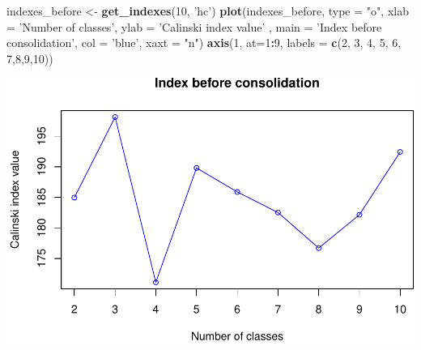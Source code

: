 \documentclass[]{article}
\newenvironment{Shaded}{\begin{snugshade}}{\end{snugshade}}
\newcommand{\KeywordTok}[1]{\textcolor[rgb]{0.13,0.29,0.53}{\textbf{#1}}}
\newcommand{\DataTypeTok}[1]{\textcolor[rgb]{0.13,0.29,0.53}{#1}}
\newcommand{\DecValTok}[1]{\textcolor[rgb]{0.00,0.00,0.81}{#1}}
\newcommand{\StringTok}[1]{\textcolor[rgb]{0.31,0.60,0.02}{#1}}
\newcommand{\OperatorTok}[1]{\textcolor[rgb]{0.81,0.36,0.00}{\textbf{#1}}}
\newcommand{\NormalTok}[1]{#1}
\begin{document}
\begin{Shaded}
\begin{Highlighting}[]
\NormalTok{indexes_before <-}\StringTok{ }\KeywordTok{get_indexes}\NormalTok{(}\DecValTok{10}\NormalTok{, }\StringTok{'hc'}\NormalTok{)}
\KeywordTok{plot}\NormalTok{(indexes_before, }\DataTypeTok{type =} \StringTok{"o"}\NormalTok{, }\DataTypeTok{xlab =} \StringTok{'Number of classes'}\NormalTok{, }\DataTypeTok{ylab =} \StringTok{'Calinski index value'}
\NormalTok{, }\DataTypeTok{main =} \StringTok{'Index before consolidation'}\NormalTok{, }\DataTypeTok{col =} \StringTok{'blue'}\NormalTok{, xaxt}
\NormalTok{=}\StringTok{ "n"}\NormalTok{)}
\KeywordTok{axis}\NormalTok{(}\DecValTok{1}\NormalTok{, }\DataTypeTok{at=}\DecValTok{1}\OperatorTok{:}\DecValTok{9}\NormalTok{, }\DataTypeTok{labels =} \KeywordTok{c}\NormalTok{(}\DecValTok{2}\NormalTok{, }\DecValTok{3}\NormalTok{, }\DecValTok{4}\NormalTok{, }\DecValTok{5}\NormalTok{, }\DecValTok{6}\NormalTok{, }\DecValTok{7}\NormalTok{,}\DecValTok{8}\NormalTok{,}\DecValTok{9}\NormalTok{,}\DecValTok{10}\NormalTok{))}
\end{Highlighting}
\end{Shaded}

\includegraphics{project_report_files/figure-latex/unnamed-chunk-18-1.pdf}
\end{document}
